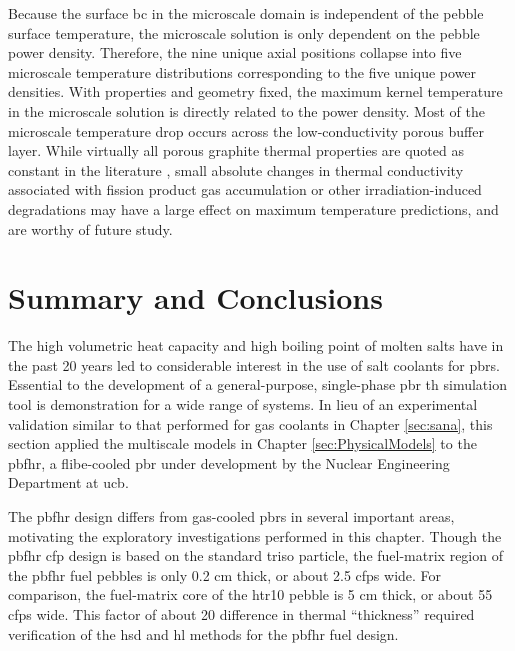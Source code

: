 Because the surface \gls{bc} in the microscale domain is independent of the pebble surface temperature, the microscale solution is only dependent on the pebble power density. Therefore, the nine unique axial positions collapse into five microscale temperature distributions corresponding to the five unique power densities. With properties and geometry fixed, the maximum kernel temperature in the microscale solution is directly related to the power density. Most of the microscale temperature drop occurs across the low-conductivity porous buffer layer. While virtually all porous graphite thermal properties are quoted as constant in the literature \cite{sun,tecdoc1694,xin_wang_thesis,stainsby,parfume,hales,rochais,lopez_honorato}, small absolute changes in thermal conductivity associated with fission product gas accumulation or other irradiation-induced degradations may have a large effect on maximum temperature predictions, and are worthy of future study.

\section{Summary and Conclusions}
\label{sec:conclusions_fhr}

The high volumetric heat capacity and high boiling point of molten salts have in the past 20 years led to considerable interest in the use of salt coolants for \glspl{pbr}. Essential to the development of a general-purpose, single-phase \gls{pbr} \gls{th} simulation tool is demonstration for a wide range of systems. In lieu of an experimental validation similar to that performed for gas coolants in Chapter \ref{sec:sana}, this section applied the multiscale models in Chapter \ref{sec:PhysicalModels} to the \gls{pbfhr}, a \gls{flibe}-cooled \gls{pbr} under development by the Nuclear Engineering Department at \gls{ucb}.

The \gls{pbfhr} design differs from gas-cooled \glspl{pbr} in several important areas, motivating the exploratory investigations performed in this chapter. Though the \gls{pbfhr} \gls{cfp} design is based on the standard \gls{triso} particle, the fuel-matrix region of the \gls{pbfhr} fuel pebbles is only 0.2 \si{\centi\meter} thick, or about 2.5 \glspl{cfp} wide. For comparison, the fuel-matrix core of the \gls{htr10} pebble is 5 \si{\centi\meter} thick, or about 55 \glspl{cfp} wide. This factor of about 20 difference in thermal ``thickness'' required verification of the \gls{hsd} and \gls{hl} methods for the \gls{pbfhr} fuel design.

